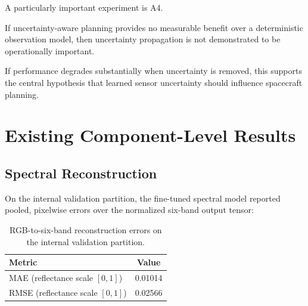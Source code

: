 \documentclass[11pt,a4paper]{article}
\begin{document}
A particularly important experiment is A4.

If uncertainty-aware planning provides no measurable benefit over a
deterministic observation model, then uncertainty propagation is not
demonstrated to be operationally important.

If performance degrades substantially when uncertainty is removed,
this supports the central hypothesis that learned sensor uncertainty
should influence spacecraft planning.


\section{Existing Component-Level Results}

\subsection{Spectral Reconstruction}

On the internal validation partition, the fine-tuned spectral model
reported pooled, pixelwise errors over the normalized six-band output
tensor:

\begin{table}[!htbp]
\centering
\caption{RGB-to-six-band reconstruction errors on the internal
validation partition.}
\label{tab:spectral-results}
\begin{tabular}{lc}
\toprule
Metric & Value\\
\midrule
MAE (reflectance scale $[0,1]$) & 0.01014\\
RMSE (reflectance scale $[0,1]$) & 0.02566\\
\bottomrule
\end{tabular}
\end{table}
\end{document}
